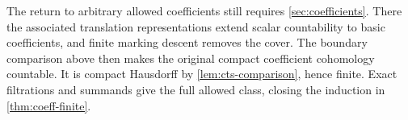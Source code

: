 The return to arbitrary allowed coefficients still requires
\cref{sec:coefficients}. There the associated translation
representations extend scalar countability to basic coefficients,
and finite marking descent removes the cover. The boundary comparison
above then makes the original compact coefficient cohomology
countable. It is compact Hausdorff by \cref{lem:cts-comparison}, hence
finite. Exact filtrations and summands give the full allowed class,
closing the induction in \cref{thm:coeff-finite}.
